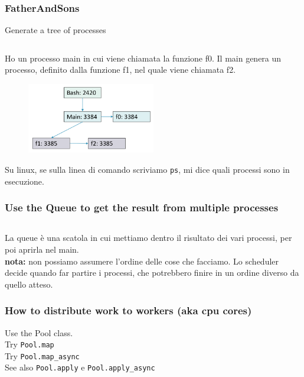 \subsubsection{FatherAndSons}
Generate a tree of processes

\inputminted{python}{python_parallel/FatherAndSons.py}


Ho un processo main in cui viene chiamata la funzione f0. Il main genera un processo, definito dalla funzione f1, nel quale viene chiamata f2.\\

\begin{figure}[ht]
    \centering
    \includegraphics[width=0.5\textwidth]{figure_parallel/father_sons.png}\end{figure}
\FloatBarrier

Su linux, se sulla linea di comando scriviamo \texttt{ps}, mi dice quali processi sono in esecuzione.\\

\subsubsection{Use the Queue to get the result from multiple processes}

\inputminted{python}{python_parallel/FourProcesses.py}


La queue è una scatola in cui mettiamo dentro il risultato dei vari processi, per poi aprirla nel main.\\
\textbf{nota:} non possiamo assumere l'ordine delle cose che facciamo. Lo scheduler decide quando far partire i processi, che potrebbero finire in un ordine diverso da quello atteso.

\subsubsection{How to distribute work to
workers (aka cpu cores)}
Use the Pool class.\\
Try \texttt{Pool.map}\\
Try \texttt{Pool.map\_async}\\
See also \texttt{Pool.apply} e \texttt{Pool.apply\_async}


